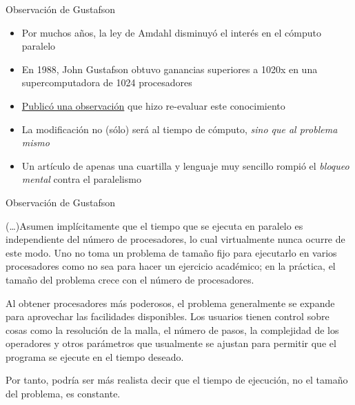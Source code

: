 \documentclass[presentation]{beamer}
\begin{document}
\begin{frame}[label={sec:org92e1ae4}]{Observación de Gustafson}
\begin{itemize}
\item Por muchos años, la ley de Amdahl disminuyó el interés en el cómputo
paralelo
\item En 1988, John Gustafson obtuvo ganancias superiores a 1020x en una
supercomputadora de 1024 procesadores
\item \href{http://www.johngustafson.net/pubs/pub13/amdahl.htm}{Publicó una observación} que hizo re-evaluar este conocimiento
\item La modificación no (sólo) será al tiempo de cómputo, \emph{sino que al
problema mismo}
\item Un artículo de apenas una cuartilla y lenguaje muy sencillo rompió
el \emph{bloqueo mental} contra el paralelismo
\end{itemize}
\end{frame}

\begin{frame}[label={sec:org0f1d4e5}]{Observación de Gustafson}
  \small

(\ldots{})Asumen implícitamente que el tiempo que se ejecuta en paralelo es
independiente del número de procesadores, \alert{lo cual virtualmente nunca
ocurre de este modo}. Uno no toma un problema de tamaño fijo para
ejecutarlo en varios procesadores como no sea para hacer un ejercicio
académico; en la práctica, \alert{el tamaño del problema crece con el número
de procesadores}. \vfill

Al obtener procesadores más poderosos, el problema generalmente se
expande para aprovechar las facilidades disponibles. Los usuarios
tienen control sobre cosas como la resolución de la malla, el número
de pasos, la complejidad de los operadores y otros parámetros que
usualmente se ajustan para permitir que el programa se ejecute en el
tiempo deseado. \vfill

Por tanto, podría ser más realista decir que el \alert{tiempo de ejecución},
no el \alert{tamaño del problema}, es constante.
\end{frame}
\end{document}
